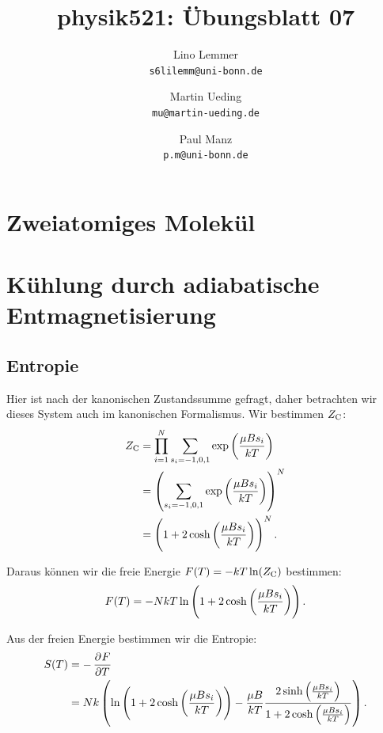 

\setcounter{section}{0}
\renewcommand\thesection{H\,7.\arabic{section}}
\renewcommand\thesubsection{\thesection.\alph{subsection}}

\title{physik521: Übungsblatt 07}
\author{%
    Lino Lemmer \\ \small{\texttt{s6lilemm@uni-bonn.de}}
    \and
    Martin Ueding \\ \small{\texttt{mu@martin-ueding.de}}
    \and
    Paul Manz \\ \small{\texttt{p.m@uni-bonn.de}}
}


\maketitle
\section{Zweiatomiges Molekül}

\section{Kühlung durch adiabatische Entmagnetisierung}

\subsection{Entropie}

Hier ist nach der kanonischen Zustandssumme gefragt, daher betrachten wir dieses System auch im kanonischen Formalismus. Wir bestimmen $Z_\text C$:
\begin{align*}
    Z_\text C
    &= \prod_{i=1}^N \sum_{s_i = -1, 0, 1} \exp\del{\frac{\mu B s_i}{k T}} \\
    &= \del{\sum_{s_i = -1, 0, 1} \exp\del{\frac{\mu B s_i}{k T}}}^N \\
    &= \del{1 + 2 \cosh\del{\frac{\mu B s_i}{k T}}}^N.
\end{align*}

Daraus können wir die freie Energie $F(T) = - k T \ln(Z_\text C)$ bestimmen:
\[
    F(T) = - N k T \ln\del{1 + 2 \cosh\del{\frac{\mu B s_i}{k T}}}.
\]

Aus der freien Energie bestimmen wir die Entropie:
\begin{align*}
    S(T)
    &= - \dpd FT \\
    &= N k \del{
        \ln\del{1 + 2 \cosh\del{\frac{\mu B s_i}{k T}}}
        - \frac{\mu B}{kT} \frac{2 \sinh\del{\frac{\mu B s_i}{k T}}}{1 + 2\cosh\del{\frac{\mu B s_i}{k T}}}
    }.
\end{align*}

